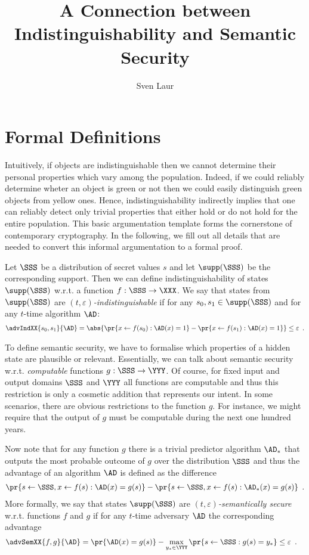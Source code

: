 \documentclass{llncs}
\title{A Connection between Indistinguishability and Semantic Security}
\author{Sven Laur}
\institute{University of Tartu}
\begin{document}
\maketitle

\section{Formal Definitions}

Intuitively, if objects are indistinguishable then we cannot determine
their personal properties which vary among the population. Indeed, if
we could reliably determine wheter an object is green or not then we
could easily distinguish green objects from yellow ones. Hence,
indistinguishability indirectly implies that one can reliably detect
only trivial properties that either hold or do not hold for the entire
population. This basic argumentation template forms the cornerstone of
contemporary cryptography. In the following, we fill out all details
that are needed to convert this informal argumentation to a formal
proof.

Let $\SSS$ be a distribution of secret values $s$ and let
$\supp(\SSS)$ be the corresponding support.  Then we can define
indistinguishability of states $\supp(\SSS)$ w.r.t. a function
$f:\SSS\to\XXX$. We say that states from $\supp(\SSS)$ are
\emph{$(t,\varepsilon)$-indistinguishable} if for any
$s_0,s_1\in\supp(\SSS)$ and for any $t$-time algorithm $\AD$:
\begin{align*}
  \advIndXX{s_0,s_1}{\AD}%
  =\abs{\pr{x\gets f(s_0):\AD(x)=1}-\pr{x\gets f(s_1):\AD(x)=1}}%
  \leq \varepsilon\enspace.
\end{align*}

To define semantic security, we have to formalise which properties of
a hidden state are plausible or relevant. Essentially, we can talk
about semantic security w.r.t. \emph{computable} functions
$g:\SSS\to\YYY$. Of course, for fixed input and output domains
$\SSS$ and $\YYY$ all functions are computable and thus this
restriction is only a cosmetic addition that represents our intent. In
some scenarios, there are obvious restrictions to the function
$g$. For instance, we might require that the output of $g$ must be
computable during the next one hundred years. 

Now note that for any function $g$ there is a trivial predictor
algorithm $\AD_*$ that outputs the most probable outcome of $g$ over
the distribution $\SSS$ and thus the advantage of an algorithm $\AD$
is defined as the difference
\begin{align*}
  \pr{s\gets\SSS, x\gets f(s): \AD(x)=g(s)}-
  \pr{s\gets\SSS, x\gets f(s): \AD_*(x)=g(s)}\enspace.
\end{align*}
More formally, we say that states $\supp(\SSS)$ are
\emph{$(t,\varepsilon)$-semantically secure} w.r.t. functions $f$ and
$g$ if for any $t$-time adversary $\AD$ the corresponding advantage
 \begin{align*}
   \advSemXX{f,g}{\AD}%
   &=\pr{ \AD(x)=g(s)}
   -\max_{y_*\in\YYY}\pr{s\gets\SSS:g(s)=y_*}\leq\varepsilon\enspace.
\end{align*}
\end{document}
